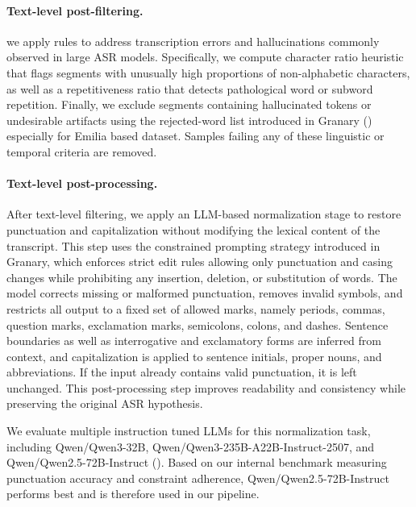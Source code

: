 \documentclass{article}
\begin{document}
\paragraph{Text-level post-filtering.}
\label{sec:text-label-post-filtering}

we apply rules to address transcription errors and hallucinations commonly observed in large ASR models. Specifically, we compute character ratio heuristic that flags segments with unusually high proportions of non-alphabetic characters, as well as a repetitiveness ratio that detects pathological word or subword repetition. Finally, we exclude segments containing hallucinated tokens or undesirable artifacts using the rejected-word list introduced in Granary (\citet{koluguri2025granaryspeechrecognitiontranslation}) especially for Emilia based dataset. Samples failing any of these linguistic or temporal criteria are removed.

\paragraph{Text-level post-processing.}
\label{sec:text-label-post-processing}

After text-level filtering, we apply an LLM-based normalization stage to restore punctuation and capitalization without modifying the lexical content of the transcript. This step uses the constrained prompting strategy introduced in Granary, which enforces strict edit rules allowing only punctuation and casing changes while prohibiting any insertion, deletion, or substitution of words. The model corrects missing or malformed punctuation, removes invalid symbols, and restricts all output to a fixed set of allowed marks, namely periods, commas, question marks, exclamation marks, semicolons, colons, and dashes. Sentence boundaries as well as interrogative and exclamatory forms are inferred from context, and capitalization is applied to sentence initials, proper nouns, and abbreviations. If the input already contains valid punctuation, it is left unchanged. This post-processing step improves readability and consistency while preserving the original ASR hypothesis.

We evaluate multiple instruction tuned LLMs for this normalization task, including Qwen/Qwen3-32B, Qwen/Qwen3-235B-A22B-Instruct-2507, and Qwen/Qwen2.5-72B-Instruct (\citet{qwen2025qwen25technicalreport}). Based on our internal benchmark measuring punctuation accuracy and constraint adherence, Qwen/Qwen2.5-72B-Instruct performs best and is therefore used in our pipeline.
\end{document}

